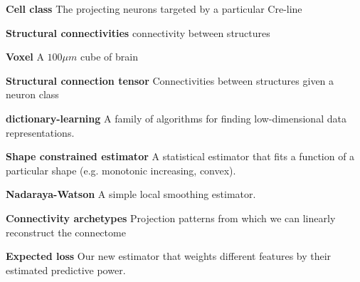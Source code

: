 \documentclass[NETN,manuscript]{stjour-new}
\begin{document}
\textbf{Cell class} The projecting neurons targeted by a particular Cre-line 

\textbf{Structural connectivities} connectivity between structures 

\textbf{Voxel} A $100 \mu m$ cube of brain

\textbf{Structural connection tensor}  Connectivities between structures given a neuron class

\textbf{dictionary-learning} A family of algorithms for finding low-dimensional data representations.

\textbf{Shape constrained estimator} A statistical estimator that fits a function of a particular shape (e.g. monotonic increasing, convex).

\textbf{Nadaraya-Watson} A simple local smoothing estimator.

\textbf{Connectivity archetypes} Projection patterns from which we can linearly reconstruct the connectome

 \textbf{Expected loss} Our new estimator that weights different features by their estimated predictive power.
 


\end{document}
